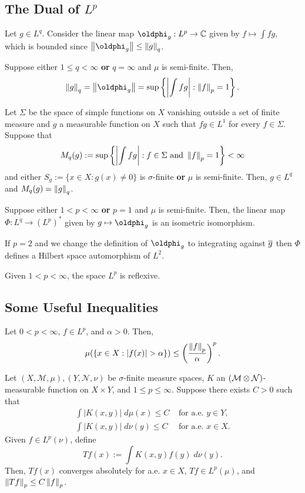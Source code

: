 \documentclass[11pt]{article}
\newcommand{\M}{\mathcal{M}}
\renewcommand{\N}{\mathcal{N}}
\renewcommand{\phi}{\oldphi}
\begin{document}
\subsection{The Dual of $L^p$}
Let $g\in L^q$. Consider the linear map $\phi_g: L^p\to\C$ given by $f\mapsto\int fg$, which is bounded since $\norm{\phi_g}\leq\norm{g}_q$.

\begin{proposition}
Suppose either $1\leq q<\infty$ \textbf{or} $q=\infty$ and $\mu$ is semi-finite. Then,
\begin{align*}
\norm{g}_q
=\norm{\phi_g}
=\sup\left\{\abs{\int fg} : \norm{f}_p=1\right\}.
\end{align*}
\end{proposition}

\begin{theorem}
Let $\Sigma$ be the space of simple functions on $X$ vanishing outside a set of finite measure and $g$ a measurable function on $X$ such that $fg\in L^1$ for every $f\in\Sigma$. Suppose that 
$$M_q(g):=\sup\left\{\left\lvert\int fg\right\rvert : f\in\Sigma\textrm{ and }\left\lVert f\right\rVert_p=1\right\}<\infty$$
and either $S_g:=\{x\in X : g(x)\neq0\}$ is $\sigma$-finite \textbf{or} $\mu$ is semi-finite. Then, $g\in L^q$ and $M_q(g)=\left\lVert g\right\rVert_q$.
\end{theorem}

\begin{theorem}
Suppose either $1<p<\infty$ \textbf{or} $p=1$ and $\mu$ is semi-finite. Then, the linear map $\Phi: L^q\to(L^p)^*$ given by $g\mapsto\phi_g$ is an isometric isomorphism.
\end{theorem}

If $p=2$ and we change the definition of $\phi_g$ to integrating against $\overline{g}$ then $\Phi$ defines a Hilbert space automorphism of $L^2$.

\begin{corollary}
Given $1<p<\infty$, the space $L^p$ is reflexive.
\end{corollary}

\subsection{Some Useful Inequalities}
\begin{proposition}
Let $0<p<\infty$, $f\in L^p$, and $\alpha>0$. Then,
$$\mu(\{x\in X : |f(x)|>\alpha\})\leq\paren{\df{\norm{f}_p}{\alpha}}^p.$$
\end{proposition}

\begin{theorem}
Let $(X,\M,\mu),(Y,\N,\nu)$ be $\sigma$-finite measure spaces, $K$ an $(\M\tensor\N)$-measurable function on $X\times Y$, and $1\leq p\leq\infty$. Suppose there exists $C>0$ such that 
\begin{align*}
\int|K(x,y)|\;d\mu(x)\leq C&\textrm{ for a.e. }y\in Y, \\
\int|K(x,y)|\;d\nu(y)\leq C&\textrm{ for a.e. }x\in X.
\end{align*}
Given $f\in L^p(\nu)$, define 
$$Tf(x):=\int K(x,y)f(y)\;d\nu(y).$$
Then, $Tf(x)$ converges absolutely for a.e. $x\in X$, $Tf\in L^p(\mu)$, and $\left\lVert Tf\right\rVert_p\leq C\left\lVert f\right\rVert_p$.
\end{theorem}
\end{document}

